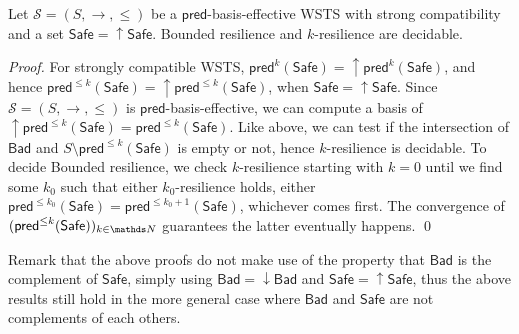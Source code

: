 \documentclass[runningheads]{llncs}
\newcommand{\pred}{\textsf{pred}}
\newcommand{\post}{\textsf{post}}
\newcommand{\Bad}{\textsf{Bad}}
\newcommand{\Safe}{\textsf{Safe}}
\begin{document}
\begin{corollary}
Let $\mathscr{S}=(S,\rightarrow, \leq)$ be a $\pred$-basis-effective WSTS with strong compatibility and a set $\Safe = \mathop{\uparrow} \Safe$.  {\sc Bounded resilience} 
and {\sc $k$-resilience} are decidable.
\end{corollary}

\begin{proof}
For strongly compatible WSTS,
$\pred^{k}(\Safe) = \mathop{\uparrow} \pred^{k}(\Safe)$,
and hence
$\pred^{\leq k}(\Safe) = \mathop{\uparrow} \pred^{\leq k}(\Safe)$,
when $\Safe = \mathop{\uparrow} \Safe$. 
Since $\mathscr{S}=(S,\rightarrow, \leq)$ is $\pred$-basis-effective, we can compute a basis of $\mathop{\uparrow} \pred^{\leq k}(\Safe) = \pred^{\leq k}(\Safe)$.
Like above, we can test if the intersection of $\Bad$
and
$S \setminus \pred^{\leq k}(\Safe)$ is empty or not, hence {\sc $k$-resilience} is decidable.
To decide {\sc Bounded resilience}, we check {\sc $k$-resilience}
starting with $k=0$ until we find some $k_0$ such that either {\sc $k_0$-resilience} holds,
either $\pred^{\leq k_0}(\Safe) = \pred^{\leq k_0+1}(\Safe)$, whichever comes first.
The convergence of $(\pred^{\leq k}(\Safe) )_{k\in\N}$ guarantees the latter eventually happens.
\qed\end{proof}


Remark that the above proofs do not make use of the 
property that $\Bad$ is the complement of $\Safe$, simply using
$\Bad=\mathop{\downarrow} \Bad$ and $\Safe=\mathop{\uparrow} \Safe$, thus 
the above results still hold in the more general case where $\Bad$ and $\Safe$ are not complements of each others.


%
%		
\end{document}
